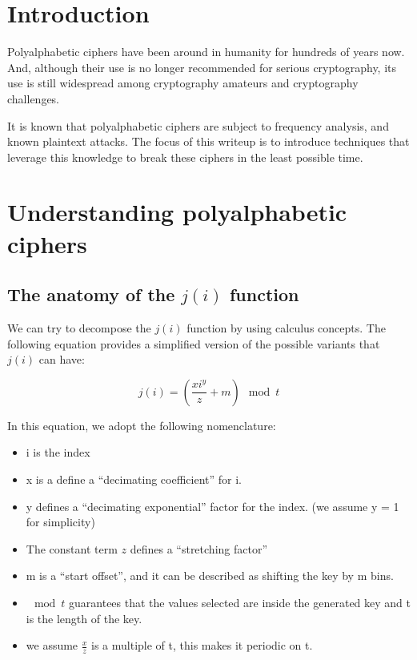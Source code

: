\documentclass[pdftex,12pt,letter]{article}
\begin{document}

\newpage
\tableofcontents
\newpage

\section{Introduction}

Polyalphabetic ciphers have been around in humanity for hundreds of years now.
And, although their use is no longer recommended for serious cryptography, its
use is still widespread among cryptography amateurs and cryptography
challenges.

It is known that polyalphabetic ciphers are subject to frequency analysis, and
known plaintext attacks. The focus of this writeup is to introduce techniques
that leverage this knowledge to break these ciphers in the least possible time.

\section{Understanding polyalphabetic ciphers}


\subsection{The anatomy of the $j(i)$ function}

We can try to decompose the $j(i)$ function by using calculus concepts. The
following equation provides a simplified version of the possible variants that
$j(i)$ can have:

\begin{equation}
    j(i) = \left( \frac{xi^y}{z} + m \right) \mod{t}
\end{equation}

In this equation, we adopt the following nomenclature:
\begin{itemize}
    \item i is the index
    \item x is a define a ``decimating coefficient'' for i.
    \item y defines a ``decimating exponential'' factor for the index. (we
        assume y = 1 for simplicity)
    \item The constant term $z$ defines a ``stretching factor''
    \item m is a ``start offset'', and it can be described as shifting the key
        by m bins.
    \item $\mod{t}$ guarantees that the values selected are inside the
        generated key and t is the length of the key.
    \item we assume $\frac{x}{z}$ is a multiple of t, this makes it periodic on t.
\end{itemize}
\end{document}
